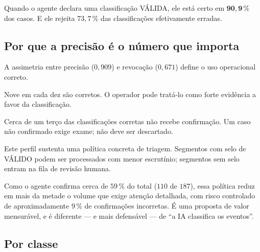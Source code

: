 \begin{resultadochave}
Quando o agente declara uma classificação VÁLIDA, ele está certo em $\bm{90{,}9\,\%}$ dos
casos. E ele rejeita $73{,}7\,\%$ das classificações efetivamente erradas.
\end{resultadochave}

\subsection{Por que a precisão é o número que importa}

A assimetria entre precisão ($0{,}909$) e revocação ($0{,}671$) define o uso operacional
correto.

\begin{description}[leftmargin=0pt,style=nextline,itemsep=0.4em]

\item[Um selo de VÁLIDO é confiável.] Nove em cada dez são corretos. O operador pode
tratá-lo como forte evidência a favor da classificação.

\item[A ausência do selo não é evidência contra.] Cerca de um terço das classificações
corretas não recebe confirmação. Um caso não confirmado exige exame; não deve ser
descartado.

\end{description}

\begin{destaque}
Este perfil sustenta uma política concreta de triagem. Segmentos com selo de VÁLIDO
podem ser processados com menor escrutínio; segmentos sem selo entram na fila de revisão
humana.

Como o agente confirma cerca de $59\,\%$ do total ($110$ de $187$), essa política reduz
em mais da metade o volume que exige atenção detalhada, com risco controlado de
aproximadamente $9\,\%$ de confirmações incorretas. É uma proposta de valor mensurável,
e é diferente --- e mais defensável --- de ``a IA classifica os eventos''.
\end{destaque}

\subsection{Por classe}

